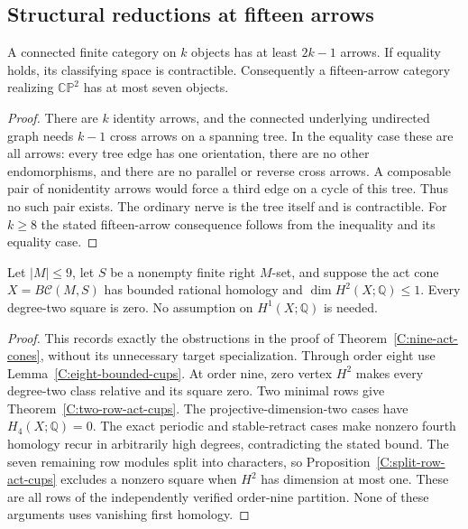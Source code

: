 \subsection{Structural reductions at fifteen arrows}

\begin{lemma}\label{C:connected-tree-budget}
A connected finite category on $k$ objects has at least $2k-1$
arrows.  If equality holds, its classifying space is contractible.
Consequently a fifteen-arrow category realizing $\mathbb{CP}^2$
has at most seven objects.
\end{lemma}
\begin{proof}
There are $k$ identity arrows, and the connected underlying
undirected graph needs $k-1$ cross arrows on a spanning tree.
In the equality case these are all arrows: every tree edge has
one orientation, there are no other endomorphisms, and there
are no parallel or reverse cross arrows.  A composable pair
of nonidentity arrows would force a third edge on a cycle of
this tree.  Thus no such pair exists.  The ordinary nerve is
the tree itself and is contractible.  For $k\geq8$ the stated
fifteen-arrow consequence follows from the inequality and its
equality case.
\end{proof}

\begin{lemma}\label{C:nine-bounded-rank-one}
Let $|M|\leq9$, let $S$ be a nonempty finite right $M$-set,
and suppose the act cone $X=B\mathcal C(M,S)$ has bounded rational
homology and $\dim H^2(X;\mathbb Q)\leq1$.  Every degree-two square
is zero.  No assumption on $H^1(X;\mathbb Q)$ is needed.
\end{lemma}
\begin{proof}
This records exactly the obstructions in the proof of
Theorem~\ref{C:nine-act-cones}, without its unnecessary target
specialization.  Through order eight use
Lemma~\ref{C:eight-bounded-cups}.  At order nine, zero vertex
$H^2$ makes every degree-two class relative and its square zero.
Two minimal rows give Theorem~\ref{C:two-row-act-cups}.
The projective-dimension-two cases have $H_4(X;\mathbb Q)=0$.
The exact periodic and stable-retract cases make nonzero fourth
homology recur in arbitrarily high degrees, contradicting the
stated bound.  The seven remaining row modules split into
characters, so Proposition~\ref{C:split-row-act-cups} excludes a
nonzero square when $H^2$ has dimension at most one.
These are all rows of the independently verified order-nine
partition.  None of these arguments uses vanishing first homology.
\end{proof}

